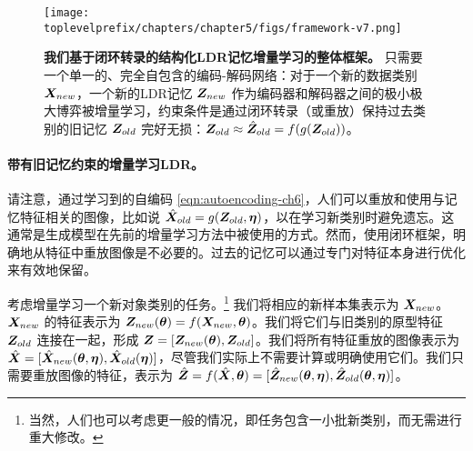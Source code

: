 \documentclass[../../book-main.tex]{subfiles}
\begin{document}
\begin{figure*}[t]
\centering
\texttt{[image: \\toplevelprefix/chapters/chapter5/figs/framework-v7.png]}
\caption{\textbf{我们基于闭环转录的结构化LDR记忆增量学习的整体框架。} 只需要一个单一的、完全自包含的编码-解码网络：对于一个新的数据类别 $\bm{X}_{new}$，一个新的LDR记忆 $\bm{Z}_{new}$ 作为编码器和解码器之间的极小极大博弈被增量学习，约束条件是通过闭环转录（或重放）保持过去类别的旧记忆 $\bm{Z}_{old}$ 完好无损：$\bm{Z}_{old} \approx \hat{\bm{Z}}_{ old} = f(g(\bm{Z}_{ old}))$。
\vspace{-0.2in}}
\label{fig:framework}
\end{figure*}

\paragraph{带有旧记忆约束的增量学习LDR。} 
请注意，通过学习到的自编码 \eqref{eqn:autoencoding-ch6}，人们可以重放和使用与记忆特征相关的图像，比如说 $\hat{\bm{X}}_{old} = g(\bm{Z}_{old}, \bm \eta)$，以在学习新类别时避免遗忘。这通常是生成模型在先前的增量学习方法中被使用的方式。然而，使用闭环框架，明确地从特征中重放图像是不必要的。过去的记忆可以通过专门对特征本身进行优化来有效地保留。

考虑增量学习一个新对象类别的任务。\footnote{当然，人们也可以考虑更一般的情况，即任务包含一小批新类别，而无需进行重大修改。} 我们将相应的新样本集表示为 $\bm{X}_{new}$。$\bm{X}_{new}$ 的特征表示为 $\bm{Z}_{new}(\bm \theta) = f(\bm{X}_{new}, \bm \theta)$。我们将它们与旧类别的原型特征 $\bm{Z}_{old}$ 连接在一起，形成 $\bm{Z} = [\bm{Z}_{new}(\bm \theta), \bm{Z}_{old}]$。我们将所有特征重放的图像表示为 $\hat{\bm{X}} = [{\hat{\bm{X}}_{new}(\bm \theta,\bm \eta)}, {\hat{\bm{X}}_{old}(\bm \eta)}]$，尽管我们实际上不需要计算或明确使用它们。我们只需要重放图像的特征，表示为 $\hat{\bm{Z}} = f(\hat{\bm{X}}, \bm \theta) =  [{\hat{\bm{Z}}_{new}(\bm \theta,\bm \eta)}, {\hat{\bm{Z}}_{old}(\bm \theta,\bm \eta)}]$。
\end{document}
